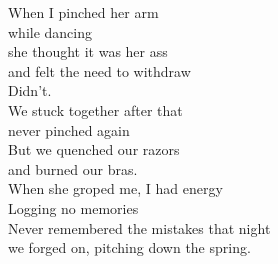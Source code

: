 When I pinched her arm\\
while dancing\\
she thought it was her ass\\
and felt the need to withdraw\\
Didn't.\\

We stuck together after that\\
never pinched again\\
But we quenched our razors\\
and burned our bras.\\

When she groped me, I had energy\\
Logging no memories\\
Never remembered the mistakes that night\\
we forged on, pitching down the spring.\\

